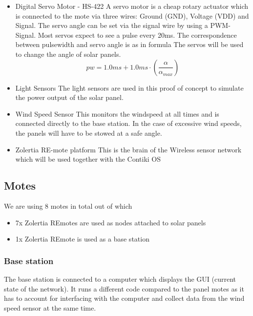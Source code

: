 \documentclass[conference]{IEEEtran}
\begin{document}
\begin{itemize}
    \item Digital Servo Motor - HS-422\cite{servoMotor}\newline
        A servo motor is a cheap rotary actuator which is connected to the mote via three wires: Ground (GND), Voltage (VDD) and Signal. The servo angle can be set via the signal wire by using a PWM-Signal. Most servos expect to see a pulse every 20ms. The correspondence between pulsewidth and servo angle is as in formula The servos will be used to change the angle of solar panels.
\begin{equation}\label{eq:Servo_PWM}
pw = 1.0ms + 1.0ms \cdot (\frac{\alpha}{\alpha_{max}})
\end{equation}
    \item Light Sensors\cite{LightSensor}\newline
        The light sensors are used in this proof of concept to simulate the power output of the solar panel.
    \item Wind Speed Sensor\cite{WindSensor}\newline
        This monitors the windspeed at all times and is connected directly to the base station. In the case of excessive wind speeds, the panels will have to be stowed at a safe angle.
    \item Zolertia RE-mote platform\cite{REmote}\newline
        This is the brain of the Wireless sensor network which will be used together with the Contiki OS

\end{itemize}

\subsection{Motes}
We are using 8 motes in total out of which
\begin{itemize}
    \item 7x Zolertia REmotes are used as nodes attached to solar panels
    \item 1x Zolertia REmote is used as a base station
\end{itemize}

\subsubsection{Base station}
    The base station is connected to a computer which displays the GUI (current state of the network). It runs a different code compared to the panel motes as it has to account for interfacing with the computer and collect data from the wind speed sensor at the same time.
\end{document}
